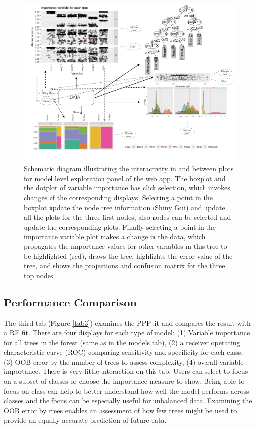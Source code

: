 \documentclass[smallextended,natbib]{svjour3}\usepackage[]{graphicx}\usepackage[]{xcolor}
\begin{document}
\begin{figure}[hbpt]
\centering
\includegraphics[width=1.05\linewidth]{fishT2.pdf}
\caption{Schematic diagram illustrating the interactivity in and between plots for model level exploration panel of the web app. The boxplot and the dotplot of variable importance has click selection, which invokes changes of the corresponding displays. Selecting a point in the boxplot update the node tree information (Shiny Gui) and update all the plots for the three first nodes, also nodes can be selected and update the corresponding plots. Finally selecting a point in the importance variable plot makes a change in the data, which propagates the importance values for other variables in this tree to be highlighted (red), draws the tree, highlights the error value of the tree, and shows the projections and confusion matrix for the three top nodes.}
\label{tab2diag}
\end{figure}
\newpage

\subsection{Performance Comparison}
The third tab (Figure \ref{tab3}) examines the PPF fit and compares the result with a RF fit. There are four displays for each type of model: (1) Variable importance for all trees in the forest (same as in the models tab), (2) a receiver operating characteristic curve (ROC) comparing sensitivity and specificity for each class, (3) OOB error by the number of trees to assess complexity, (4) overall variable importance. There is very little interaction on this tab. Users can select to focus on a subset of classes or choose the importance measure to show. Being able to focus on class can help to better understand how well the model performs across classes and the focus can be especially useful for unbalanced data. Examining the OOB error by trees enables an assessment of how few trees might be used to provide an equally accurate prediction of future data.
\end{document}
